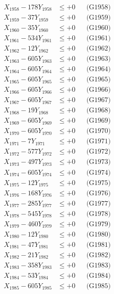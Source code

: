 \documentclass[a4paper,10pt]{article}
\begin{document}
{\begin{align}
X_{1958} - 178Y_{1958} &\leq +0 && \text{(G1958)} \\
X_{1959} - 37Y_{1959} &\leq +0 && \text{(G1959)} \\
X_{1960} - 35Y_{1960} &\leq +0 && \text{(G1960)} \\
\allowbreak
X_{1961} - 534Y_{1961} &\leq +0 && \text{(G1961)} \\
X_{1962} - 12Y_{1962} &\leq +0 && \text{(G1962)} \\
X_{1963} - 605Y_{1963} &\leq +0 && \text{(G1963)} \\
X_{1964} - 605Y_{1964} &\leq +0 && \text{(G1964)} \\
X_{1965} - 605Y_{1965} &\leq +0 && \text{(G1965)} \\
X_{1966} - 605Y_{1966} &\leq +0 && \text{(G1966)} \\
X_{1967} - 605Y_{1967} &\leq +0 && \text{(G1967)} \\
X_{1968} - 19Y_{1968} &\leq +0 && \text{(G1968)} \\
X_{1969} - 605Y_{1969} &\leq +0 && \text{(G1969)} \\
X_{1970} - 605Y_{1970} &\leq +0 && \text{(G1970)} \\
\allowbreak
X_{1971} - 7Y_{1971} &\leq +0 && \text{(G1971)} \\
X_{1972} - 577Y_{1972} &\leq +0 && \text{(G1972)} \\
X_{1973} - 497Y_{1973} &\leq +0 && \text{(G1973)} \\
X_{1974} - 605Y_{1974} &\leq +0 && \text{(G1974)} \\
X_{1975} - 12Y_{1975} &\leq +0 && \text{(G1975)} \\
X_{1976} - 168Y_{1976} &\leq +0 && \text{(G1976)} \\
X_{1977} - 285Y_{1977} &\leq +0 && \text{(G1977)} \\
X_{1978} - 545Y_{1978} &\leq +0 && \text{(G1978)} \\
X_{1979} - 460Y_{1979} &\leq +0 && \text{(G1979)} \\
X_{1980} - 12Y_{1980} &\leq +0 && \text{(G1980)} \\
\allowbreak
X_{1981} - 47Y_{1981} &\leq +0 && \text{(G1981)} \\
X_{1982} - 21Y_{1982} &\leq +0 && \text{(G1982)} \\
X_{1983} - 358Y_{1983} &\leq +0 && \text{(G1983)} \\
X_{1984} - 53Y_{1984} &\leq +0 && \text{(G1984)} \\
X_{1985} - 605Y_{1985} &\leq +0 && \text{(G1985)} \\

\end{align}}
\end{document}

